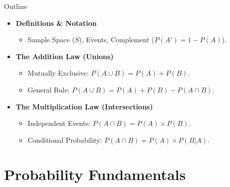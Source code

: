 \begin{frame}{Outline}

    
    \begin{itemize}
        \item \textbf{Definitions \& Notation}
            \begin{itemize}
                \item Sample Space ($S$), Events, Complement ($P(A') = 1 - P(A)$).
            \end{itemize}
            
            
        \item \textbf{The Addition Law (Unions)}
            \begin{itemize}
                \item Mutually Exclusive: $P(A \cup B) = P(A) + P(B)$.
                \item General Rule: $P(A \cup B) = P(A) + P(B) - P(A \cap B)$.
            \end{itemize}
            
            
        \item \textbf{The Multiplication Law (Intersections)}
            \begin{itemize}
                \item Independent Events: $P(A \cap B) = P(A) \times P(B)$.
                \item Conditional Probability: $P(A \cap B) = P(A) \times P(B|A)$.
            \end{itemize}
    \end{itemize}
    
\end{frame}

\section{Probability Fundamentals}





